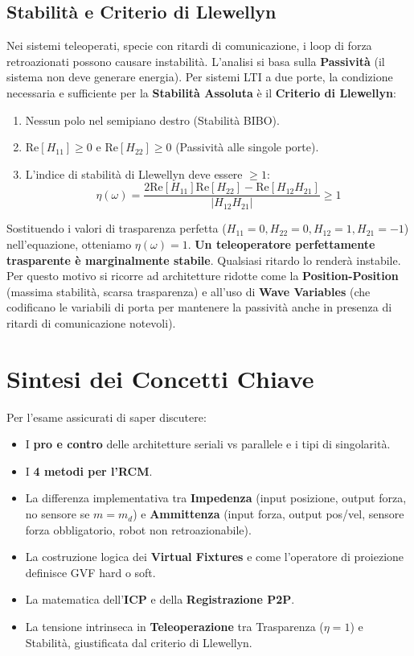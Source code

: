 \documentclass[11pt,a4paper,twoside]{report}
\begin{document}
\section{Stabilità e Criterio di Llewellyn}
Nei sistemi teleoperati, specie con ritardi di comunicazione, i loop di forza retroazionati possono causare instabilità. L'analisi si basa sulla \textbf{Passività} (il sistema non deve generare energia).
Per sistemi LTI a due porte, la condizione necessaria e sufficiente per la \textbf{Stabilità Assoluta} è il \textbf{Criterio di Llewellyn}:
\begin{enumerate}
    \item Nessun polo nel semipiano destro (Stabilità BIBO).
    \item $\text{Re}[H_{11}] \ge 0$ e $\text{Re}[H_{22}] \ge 0$ (Passività alle singole porte).
    \item L'indice di stabilità di Llewellyn deve essere $\ge 1$:
    \begin{equation}
        \eta(\omega) = \frac{2 \text{Re}[H_{11}] \text{Re}[H_{22}] - \text{Re}[H_{12}H_{21}]}{|H_{12}H_{21}|} \ge 1
    \end{equation}
\end{enumerate}

\begin{warningbox}
    Sostituendo i valori di trasparenza perfetta ($H_{11}=0, H_{22}=0, H_{12}=1, H_{21}=-1$) nell'equazione, otteniamo $\eta(\omega) = 1$.
    \textbf{Un teleoperatore perfettamente trasparente è marginalmente stabile}. Qualsiasi ritardo lo renderà instabile. Per questo motivo si ricorre ad architetture ridotte come la \textbf{Position-Position} (massima stabilità, scarsa trasparenza) e all'uso di \textbf{Wave Variables} (che codificano le variabili di porta per mantenere la passività anche in presenza di ritardi di comunicazione notevoli).
\end{warningbox}

\chapter{Sintesi dei Concetti Chiave}
Per l'esame assicurati di saper discutere:
\begin{itemize}
    \item I \textbf{pro e contro} delle architetture seriali vs parallele e i tipi di singolarità.
    \item I \textbf{4 metodi per l'RCM}.
    \item La differenza implementativa tra \textbf{Impedenza} (input posizione, output forza, no sensore se $m=m_d$) e \textbf{Ammittenza} (input forza, output pos/vel, sensore forza obbligatorio, robot non retroazionabile).
    \item La costruzione logica dei \textbf{Virtual Fixtures} e come l'operatore di proiezione definisce GVF hard o soft.
    \item La matematica dell'\textbf{ICP} e della \textbf{Registrazione P2P}.
    \item La tensione intrinseca in \textbf{Teleoperazione} tra Trasparenza ($\eta=1$) e Stabilità, giustificata dal criterio di Llewellyn.
\end{itemize}
\end{document}
